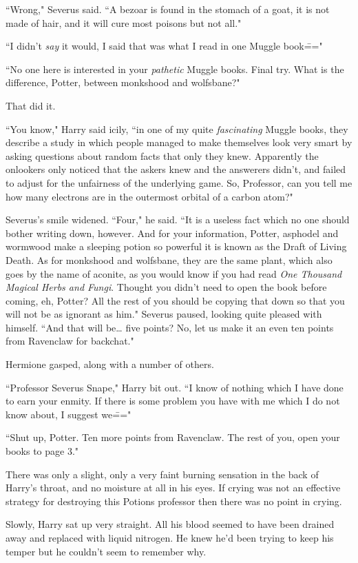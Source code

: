 ``Wrong," Severus said. ``A bezoar is found in the stomach of a goat, it is not made of hair, and it will cure most poisons but not all."

``I didn't \emph{say} it would, I said that was what I read in one Muggle book\==="

``No one here is interested in your \emph{pathetic} Muggle books. Final try. What is the difference, Potter, between monkshood and wolfsbane?"

That did it.

``You know," Harry said icily, ``in one of my quite \emph{fascinating} Muggle books, they describe a study in which people managed to make themselves look very smart by asking questions about random facts that only they knew. Apparently the onlookers only noticed that the askers knew and the answerers didn't, and failed to adjust for the unfairness of the underlying game. So, Professor, can you tell me how many electrons are in the outermost orbital of a carbon atom?"

Severus's smile widened. ``Four," he said. ``It is a useless fact which no one should bother writing down, however. And for your information, Potter, asphodel and wormwood make a sleeping potion so powerful it is known as the Draft of Living Death. As for monkshood and wolfsbane, they are the same plant, which also goes by the name of aconite, as you would know if you had read \emph{One Thousand Magical Herbs and Fungi}. Thought you didn't need to open the book before coming, eh, Potter? All the rest of you should be copying that down so that you will not be as ignorant as him." Severus paused, looking quite pleased with himself. ``And that will be{\ldots} five points? No, let us make it an even ten points from Ravenclaw for backchat."

Hermione gasped, along with a number of others.

``Professor Severus Snape," Harry bit out. ``I know of nothing which I have done to earn your enmity. If there is some problem you have with me which I do not know about, I suggest we\==="

``Shut up, Potter. Ten more points from Ravenclaw. The rest of you, open your books to page 3."

There was only a slight, only a very faint burning sensation in the back of Harry's throat, and no moisture at all in his eyes. If crying was not an effective strategy for destroying this Potions professor then there was no point in crying.

Slowly, Harry sat up very straight. All his blood seemed to have been drained away and replaced with liquid nitrogen. He knew he'd been trying to keep his temper but he couldn't seem to remember why.

